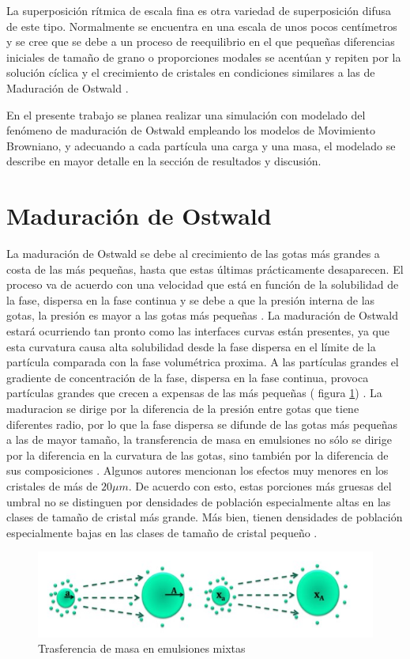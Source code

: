 \documentclass[3pt,twocolumn]{elsarticle}
\begin{document}
La superposición rítmica de escala fina es otra variedad de superposición difusa de este tipo. Normalmente se encuentra en una escala de unos pocos centímetros y se cree que se debe a un proceso de reequilibrio en el que pequeñas diferencias iniciales de tamaño de grano o proporciones modales se acentúan y repiten por la solución cíclica y el crecimiento de cristales en condiciones similares a las de Maduración de Ostwald
\cite{a6}.

En el presente trabajo se planea realizar una simulación con modelado del fenómeno de maduración de Ostwald empleando los modelos de Movimiento Browniano, y adecuando a cada partícula una carga y una masa, el modelado se describe en mayor detalle en la sección de resultados y discusión.


\section{Maduración de Ostwald}
La maduración de Ostwald se debe al crecimiento de las gotas más grandes a costa de las más pequeñas, hasta que estas últimas prácticamente desaparecen. El proceso va de acuerdo con una velocidad que está en función de la solubilidad de la fase, dispersa en la fase continua y se debe a que la presión interna de las gotas, la presión es mayor a las gotas más pequeñas \cite{a15}. La maduración de Ostwald estará ocurriendo tan pronto como las interfaces curvas están presentes, ya que esta curvatura causa alta solubilidad desde la fase dispersa en el límite de la partícula comparada con la fase volumétrica proxima. A las partículas grandes el gradiente de concentración de la fase, dispersa en la fase continua, provoca partículas grandes que crecen a expensas de las más pequeñas ( figura \ref{a14i}) \cite{a14}.
La maduracion se dirige por la diferencia de la presión entre gotas que tiene diferentes radio, por lo que la fase dispersa se difunde de las gotas más pequeñas a las de mayor tamaño, la transferencia de masa en emulsiones no sólo se dirige por la diferencia en la curvatura de las gotas, sino también por la diferencia de sus composiciones \cite{a15}. Algunos autores mencionan los efectos muy menores en los cristales de más de $20 \mu m$. De acuerdo con esto, estas porciones más gruesas del umbral no se distinguen por densidades de población especialmente altas en las clases de tamaño de cristal más grande. Más bien, tienen densidades de población especialmente bajas en las clases de tamaño de cristal pequeño \cite{a7}.


	\begin{figure}[h!]
				\centering
				\includegraphics[scale=0.5]{a14.jpg} 
				\caption{Trasferencia de masa en emulsiones mixtas \cite{a14}}
		\label{a14i}
\end{figure}
\end{document}
